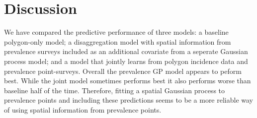 \documentclass{statsoc}
\begin{document}






\begin{table}
\caption{\label{table3}Summary of coverage of 80\% credible intervals. The proportion of held out data points that fall within their 80\% credible intervals. 
Cases where this is below 0.7 are highlighted in bold.}
\centering
{}
\end{table}


\section*{Discussion}



We have compared the predictive performance of three models: a baseline polygon-only model; a disaggregation model with spatial information from prevalence surveys included as an additional covariate from a seperate Gaussian process model; and a model that jointly learns from polygon incidence data and prevalence point-surveys.
Overall the prevalence GP model appears to peform best.
While the joint model sometimes performs best it also performs worse than baseline half of the time.
Therefore, fitting a spatial Gaussian process to prevalence points and including these predictions seems to be a more reliable way of using spatial information from prevalence points.
\end{document}
